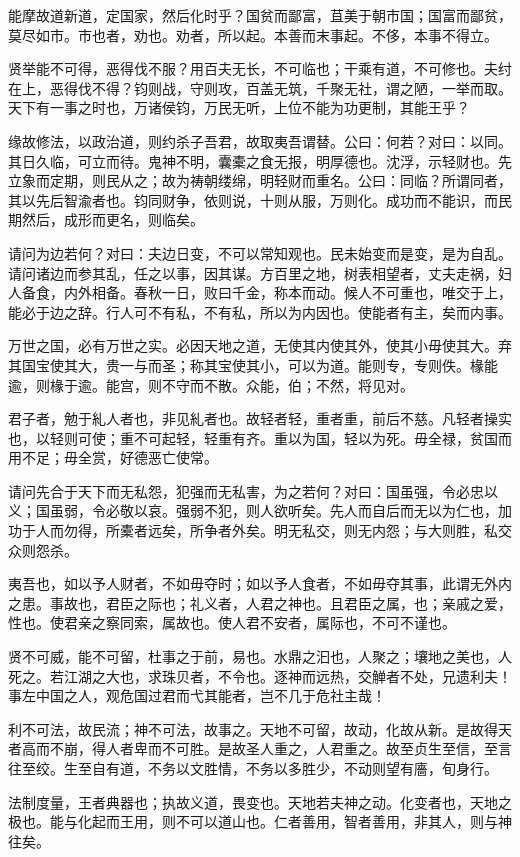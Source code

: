\documentclass[]{article}
\begin{document}
能摩故道新道，定国家，然后化时乎？国贫而鄙富，苴美于朝市国；国富而鄙贫，莫尽如市。市也者，劝也。劝者，所以起。本善而末事起。不侈，本事不得立。

贤举能不可得，恶得伐不服？用百夫无长，不可临也；干乘有道，不可修也。夫纣在上，恶得伐不得？钧则战，守则攻，百盖无筑，千聚无社，谓之陋，一举而取。天下有一事之时也，万诸侯钧，万民无听，上位不能为功更制，其能王乎？

缘故修法，以政治道，则约杀子吾君，故取夷吾谓替。公曰：何若？对曰：以同。其日久临，可立而待。鬼神不明，囊橐之食无报，明厚德也。沈浮，示轻财也。先立象而定期，则民从之；故为祷朝缕绵，明轻财而重名。公曰：同临？所谓同者，其以先后智渝者也。钧同财争，依则说，十则从服，万则化。成功而不能识，而民期然后，成形而更名，则临矣。

请问为边若何？对曰：夫边日变，不可以常知观也。民未始变而是变，是为自乱。请问诸边而参其乱，任之以事，因其谋。方百里之地，树表相望者，丈夫走祸，妇人备食，内外相备。春秋一日，败曰千金，称本而动。候人不可重也，唯交于上，能必于边之辞。行人可不有私，不有私，所以为内因也。使能者有主，矣而内事。

万世之国，必有万世之实。必因天地之道，无使其内使其外，使其小毋使其大。弃其国宝使其大，贵一与而圣；称其宝使其小，可以为道。能则专，专则佚。椽能逾，则椽于逾。能宫，则不守而不散。众能，伯；不然，将见对。

君子者，勉于糺人者也，非见糺者也。故轻者轻，重者重，前后不慈。凡轻者操实也，以轻则可使；重不可起轻，轻重有齐。重以为国，轻以为死。毋全禄，贫国而用不足；毋全赏，好德恶亡使常。

请问先合于天下而无私怨，犯强而无私害，为之若何？对曰：国虽强，令必忠以义；国虽弱，令必敬以哀。强弱不犯，则人欲听矣。先人而自后而无以为仁也，加功于人而勿得，所橐者远矣，所争者外矣。明无私交，则无内怨；与大则胜，私交众则怨杀。

夷吾也，如以予人财者，不如毋夺时；如以予人食者，不如毋夺其事，此谓无外内之患。事故也，君臣之际也；礼义者，人君之神也。且君臣之属，也；亲戚之爱，性也。使君亲之察同索，属故也。使人君不安者，属际也，不可不谨也。

贤不可威，能不可留，杜事之于前，易也。水鼎之汩也，人聚之；壤地之美也，人死之。若江湖之大也，求珠贝者，不令也。逐神而远热，交觯者不处，兄遗利夫！事左中国之人，观危国过君而弋其能者，岂不几于危社主哉！

利不可法，故民流；神不可法，故事之。天地不可留，故动，化故从新。是故得天者高而不崩，得人者卑而不可胜。是故圣人重之，人君重之。故至贞生至信，至言往至绞。生至自有道，不务以文胜情，不务以多胜少，不动则望有廧，旬身行。

法制度量，王者典器也；执故义道，畏变也。天地若夫神之动。化变者也，天地之极也。能与化起而王用，则不可以道山也。仁者善用，智者善用，非其人，则与神往矣。
\end{document}
